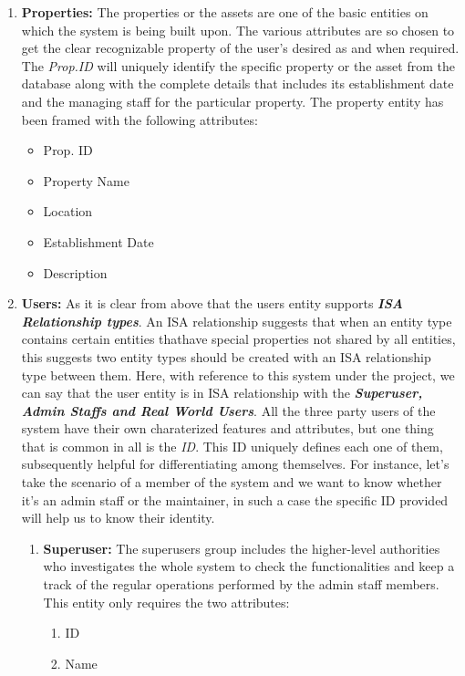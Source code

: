 \documentclass[12pt]{report}
\begin{document}
\begin{enumerate}
\item \textbf{Properties:} The properties or the assets are one of the basic entities on which the system is being built upon. The various attributes are so chosen to get the clear recognizable property of the user's desired as and when required. The \textit{Prop.ID} will uniquely identify the specific property or the asset from the database along with the complete details that includes its establishment date and the managing staff for the particular property. The property entity has been framed with the following attributes:
\begin{itemize}
\item Prop. ID
\item Property Name
\item Location
\item Establishment Date
\item Description
\end{itemize}

\item \textbf{Users:} As it is clear from above that the users entity supports \textbf{\textit{ISA Relationship types}}. An ISA relationship suggests that when an entity type contains certain entities thathave special properties not shared by all entities, this suggests two entity types should be created with an ISA relationship type between them. Here, with reference to this system under the project, we can say that the user entity is in ISA relationship with the \textbf{\textit{Superuser, Admin Staffs and Real World Users}}. All the three party users of the system have their own charaterized features and attributes, but one thing that is common in all is the \textit{ID}. This ID uniquely defines each one of them, subsequently helpful for differentiating among themselves. For instance, let's take the scenario of a member of the system and we want to know whether it's an admin staff or the maintainer, in such a case the specific ID provided will help us to know their identity.
\begin{enumerate}
\item \textbf{Superuser:} The superusers group includes the higher-level authorities who investigates the whole system to check the functionalities and keep a track of the regular operations performed by the admin staff members. This entity only requires the two attributes:
\begin{enumerate}
\item ID
\item Name  
\end{enumerate}


\end{enumerate}
\end{enumerate}
\end{document}
